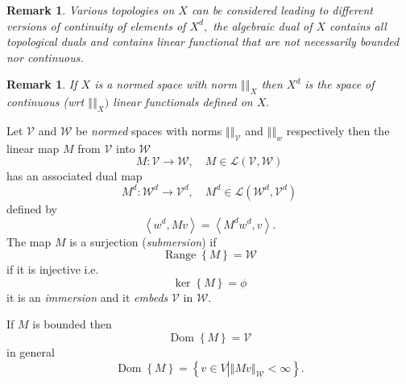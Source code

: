 \documentclass[aps,preprint]{revtex4}%
\newtheorem{remark}[theorem]{Remark}
\begin{document}
\begin{remark}
Various topologies on $X$ can be considered leading to different versions of
continuity of elements of $X^{d},$ the algebraic dual of $X$ contains all
topological duals and contains linear functional that are not necessarily
bounded nor continuous.
\end{remark}

\begin{remark}
If $X$ is a normed space with norm $\left\Vert {}\right\Vert _{X}$ then
$X^{d}$ is the space of continuous (wrt $\left\Vert {}\right\Vert _{X})$
linear functionals defined on $X.$
\end{remark}

Let $\mathcal{V}$ and $\mathcal{W}$ be \emph{normed} spaces with norms
$\left\Vert {}\right\Vert _{\mathcal{V}}$ and $\left\Vert {}\right\Vert _{w}$
respectively then the linear map $M$ from $\mathcal{V}$ into $\mathcal{W}$
\begin{equation}
M:\mathcal{V}\rightarrow\mathcal{W},\quad M\in\mathcal{L}\left(
\mathcal{V},\mathcal{W}\right)
\end{equation}
has an associated dual map
\begin{equation}
M^{d}:\mathcal{W}^{d}\rightarrow\mathcal{V}^{d},\quad M^{d}\in\mathcal{L}%
\left(  \mathcal{W}^{d},\mathcal{V}^{d}\right)
\end{equation}
defined by%
\begin{equation}
\left\langle w^{d},Mv\right\rangle =\left\langle M^{d}w^{d},v\right\rangle .
\end{equation}
The map $M$ is a surjection (\emph{submersion}) if
\begin{equation}
\operatorname*{Range}\left\{  M\right\}  =\mathcal{W}%
\end{equation}
if it is injective i.e.
\begin{equation}
\ker\left\{  M\right\}  =\phi
\end{equation}
it is an \emph{immersion} and it \emph{embeds} $\mathcal{V}$ in $\mathcal{W}.$

If $M$ is bounded then
\begin{equation}
\operatorname*{Dom}\left\{  M\right\}  =\mathcal{V}%
\end{equation}
in general
\begin{equation}
\operatorname*{Dom}\left\{  M\right\}  =\left\{  \left.  \overset{}{v\in
V}\right\vert \left\Vert Mv\right\Vert _{\mathcal{W}}<\infty\right\}  .
\end{equation}
\end{document}
